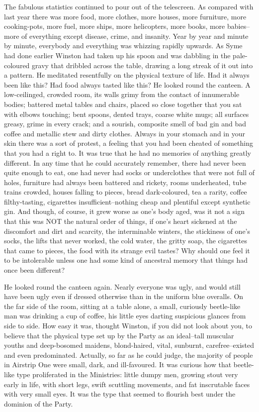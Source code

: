 \documentclass{article}
\begin{document}
The fabulous statistics continued to pour out of the telescreen. As
compared with last year there was more food, more clothes, more houses,
more furniture, more cooking-pots, more fuel, more ships, more helicopters,
more books, more babies--more of everything except disease, crime, and
insanity. Year by year and minute by minute, everybody and everything was
whizzing rapidly upwards. As Syme had done earlier Winston had taken up
his spoon and was dabbling in the pale-coloured gravy that dribbled across
the table, drawing a long streak of it out into a pattern. He meditated
resentfully on the physical texture of life. Had it always been like
this? Had food always tasted like this? He looked round the canteen.
A low-ceilinged, crowded room, its walls grimy from the contact of
innumerable bodies; battered metal tables and chairs, placed so close
together that you sat with elbows touching; bent spoons, dented trays,
coarse white mugs; all surfaces greasy, grime in every crack; and a
sourish, composite smell of bad gin and bad coffee and metallic stew and
dirty clothes. Always in your stomach and in your skin there was a sort
of protest, a feeling that you had been cheated of something that you had
a right to. It was true that he had no memories of anything greatly
different. In any time that he could accurately remember, there had never
been quite enough to eat, one had never had socks or underclothes that
were not full of holes, furniture had always been battered and rickety,
rooms underheated, tube trains crowded, houses falling to pieces,
bread dark-coloured, tea a rarity, coffee filthy-tasting, cigarettes
insufficient--nothing cheap and plentiful except synthetic gin. And though,
of course, it grew worse as one's body aged, was it not a sign that this
was NOT the natural order of things, if one's heart sickened at the
discomfort and dirt and scarcity, the interminable winters, the stickiness
of one's socks, the lifts that never worked, the cold water, the gritty
soap, the cigarettes that came to pieces, the food with its strange evil
tastes? Why should one feel it to be intolerable unless one had some kind
of ancestral memory that things had once been different?

He looked round the canteen again. Nearly everyone was ugly, and would
still have been ugly even if dressed otherwise than in the uniform blue
overalls. On the far side of the room, sitting at a table alone, a small,
curiously beetle-like man was drinking a cup of coffee, his little eyes
darting suspicious glances from side to side. How easy it was, thought
Winston, if you did not look about you, to believe that the physical type
set up by the Party as an ideal--tall muscular youths and deep-bosomed
maidens, blond-haired, vital, sunburnt, carefree--existed and even
predominated. Actually, so far as he could judge, the majority of people
in Airstrip One were small, dark, and ill-favoured. It was curious how that
beetle-like type proliferated in the Ministries: little dumpy men, growing
stout very early in life, with short legs, swift scuttling movements, and
fat inscrutable faces with very small eyes. It was the type that seemed to
flourish best under the dominion of the Party.
\end{document}
